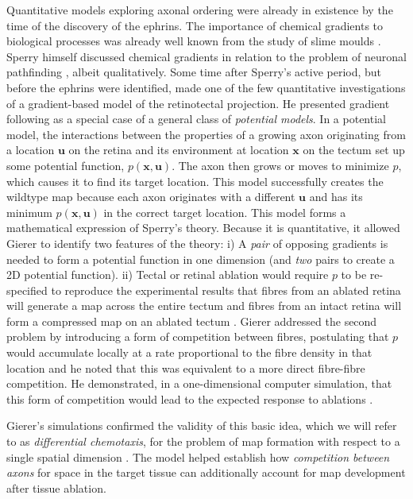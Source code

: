 \documentclass[11pt, a4paper]{article}
\begin{document}
Quantitative models exploring axonal ordering were already in existence by the time of the discovery of the ephrins. 
The importance of chemical gradients to biological processes was already well known from the study of slime moulds \citep{bonner_evidence_1947}. 
Sperry himself discussed chemical gradients in relation to the problem of neuronal pathfinding \citep{sperry_problems_1955}, albeit qualitatively.  
Some time after Sperry's active period, but before the ephrins were identified, \citet{gierer_development_1981,gierer_model_1983,gierer_directional_1987} made one of the few quantitative investigations of a gradient-based model of the retinotectal projection. He presented gradient following as a special case of a general class of \emph{potential models}. 
In a potential model, the interactions between the properties of a growing axon originating from a location $\mathbf{u}$ on the retina and its environment at location $\mathbf{x}$ on the tectum set up some potential function, $p(\mathbf{x},\mathbf{u})$. 
The axon then grows or moves to minimize $p$, which causes it to find its target location. This model successfully creates the wildtype map because each axon originates with a different $\mathbf{u}$ and has its minimum $p(\mathbf{x},\mathbf{u})$ in the correct target location.
This model forms a mathematical expression of Sperry's theory. Because it is quantitative, it allowed Gierer to identify two features of the theory: i) A \emph{pair} of opposing gradients is needed to form a potential function in one dimension (and \emph{two} pairs to create a 2D potential function). ii) Tectal or retinal ablation would require $p$ to be re-specified to reproduce the experimental results that fibres from an ablated retina will generate a map across the entire tectum and fibres from an intact retina will form a compressed map on an ablated tectum \citep{attardi_preferential_1963,schmidt_retinal_1978,schmidt_expansion_1978}.
Gierer addressed the second problem by introducing a form of competition between fibres, postulating that $p$ would accumulate locally at a rate proportional to the fibre density in that location and he noted that this was equivalent to a more direct fibre-fibre competition.
He demonstrated, in a one-dimensional computer simulation, that this form of competition would lead to the expected response to ablations \citep{gierer_model_1983}.

Gierer's simulations confirmed the validity of this basic idea, which we will refer to as \emph{differential chemotaxis}, for the problem of map formation with respect to a single spatial dimension \citep{gierer_model_1983,karbowski_model_2004}. 
The model helped establish how \emph{competition between axons} for space in the target tissue can additionally account for  map development after tissue ablation.
\end{document}
